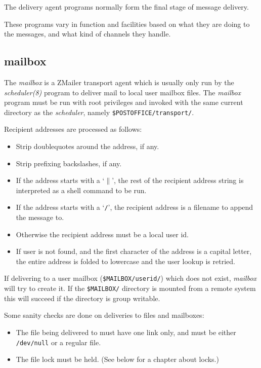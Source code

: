 
The delivery agent programs normally form the final stage of message delivery.

These programs vary in function and facilities based on what they are
doing to the messages, and what kind of channels they handle.

\subsection{mailbox}

The {\em mailbox\/} is a ZMailer transport agent which is usually
only run by the {\em scheduler(8)\/} program to deliver mail to
local user mailbox files. The {\em mailbox\/} program must be
run with root privileges and invoked with the same current 
directory as the {\em scheduler\/}, namely 
{\tt \$POSTOFFICE/transport/}.

Recipient addresses are processed  as follows: 

\begin{itemize}
\item Strip doublequotes around the address, if any. 
\item Strip prefixing backslashes, if any.  
\item If the address starts with a `{\tt $\|$}', the rest of the recipient address 
string is interpreted as  a shell command to be run. 
\item If the address starts with a `{\tt /}', the recipient address is a  filename
to append the message to. 
\item Otherwise the recipient address must be a local user id. 
\item If user is not  found,  and the first character of the address is a capital 
letter, the entire address is folded to lowercase and the user lookup is  retried.
\end{itemize}


If delivering to a user mailbox ({\tt \$MAILBOX/userid/}) which
does not exist, {\em mailbox\/} will try to create it. If the
{\tt \$MAILBOX/} directory is mounted from a remote system this
will succeed if the directory is group writable.

Some sanity checks are done on deliveries to files and mailboxes:

\begin{itemize}
\item The file being delivered to must have one link only, and must be either 
{\tt /dev/null} or a regular file.
\item The file lock must be held. (See below for a chapter about locks.)  
\end{itemize}


